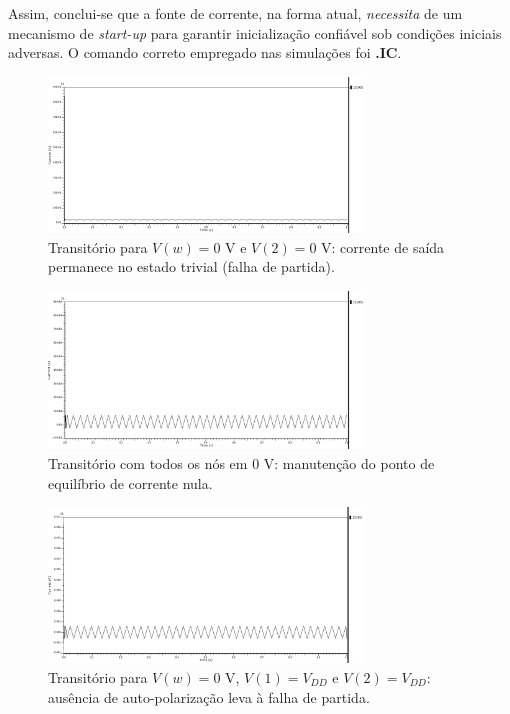 \documentclass[12pt,a4paper]{article}
\begin{document}
Assim, conclui-se que a fonte de corrente, na forma atual, \textit{necessita} de um mecanismo de \emph{start-up} para garantir inicialização confiável sob condições iniciais adversas. O comando correto empregado nas simulações foi \textbf{.IC}.

\begin{figure}[H]
    \centering
    \includegraphics[width=0.75\textwidth]{images/corrente_saida_vw_0_v2_0.png}
    \caption{Transitório para $V(w)=0$ V e $V(2)=0$ V: corrente de saída permanece no estado trivial (falha de partida).}
    \label{fig:startup_vw0_v20}
\end{figure}

\begin{figure}[H]
    \centering
    \includegraphics[width=0.75\textwidth]{images/corrente_saida_todos_zero.png}
    \caption{Transitório com todos os nós em $0$ V: manutenção do ponto de equilíbrio de corrente nula.}
    \label{fig:startup_todos_zero}
\end{figure}

\begin{figure}[H]
    \centering
    \includegraphics[width=0.75\textwidth]{images/corrente_saida_vw_0_v1_e_v2_3.png}
    \caption{Transitório para $V(w)=0$ V, $V(1)=V_{DD}$ e $V(2)=V_{DD}$: ausência de auto-polarização leva à falha de partida.}
    \label{fig:startup_vw0_v1v2_vdd}
\end{figure}
\end{document}
